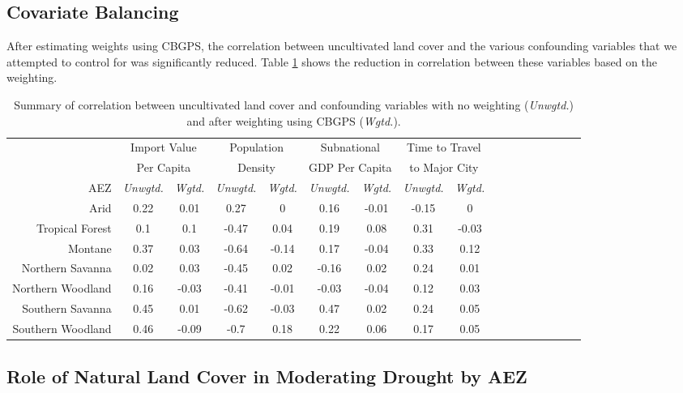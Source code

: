 \documentclass{article}
\begin{document}
\subsection{Covariate Balancing}
After estimating weights using CBGPS, the correlation between uncultivated land cover and the various confounding variables that we attempted to control for was significantly reduced.  Table \ref{tab:CBPSsum} shows the reduction in correlation between these variables based on the weighting.

\begin{table}[h!]
	\begin{center}
		\begin{tabular}{r | c c c c c c c c c c c c c c c c }
&	\multicolumn{2}{c}{Import Value} &	\multicolumn{2}{c}{Population} &	\multicolumn{2}{c}{Subnational}	&	\multicolumn{2}{c}{Time to Travel}	\\
&	\multicolumn{2}{c}{Per Capita} &	\multicolumn{2}{c}{Density} &	\multicolumn{2}{c}{GDP Per Capita}	&	\multicolumn{2}{c}{to Major City}	\\
	\cmidrule(lr){2-3}\cmidrule(lr){4-5} \cmidrule(lr){6-7}\cmidrule(lr){8-9}
      AEZ	&	\textit{Unwgtd.}	&	\textit{Wgtd.}	&	\textit{Unwgtd.}	&	\textit{Wgtd.}	&	\textit{Unwgtd.}	&	\textit{Wgtd.}	&	\textit{Unwgtd.}	&	\textit{Wgtd.}	\\
\hline									
Arid	&	0.22	&	0.01	&	0.27	&	0 &	0.16	&	-0.01	&	-0.15	&	0	\\
Tropical Forest	&	0.1	&	0.1	&	-0.47	&	0.04&	0.19	&	0.08	&	0.31	&	-0.03	\\
Montane	&	0.37	&	0.03	&	-0.64	&	-0.14&	0.17	&	-0.04	&	0.33	&	0.12	\\
Northern Savanna	&	0.02	&	0.03	&	-0.45	&	0.02&	-0.16	&	0.02	&	0.24	&	0.01	\\
Northern Woodland	&	0.16	&	-0.03	&	-0.41	&	-0.01&	-0.03	&	-0.04	&	0.12	&	0.03	\\
Southern Savanna	&	0.45	&	0.01	&	-0.62	&	-0.03&	0.47	&	0.02	&	0.24	&	0.05	\\
Southern Woodland	&	0.46	&	-0.09	&	-0.7	&	0.18&	0.22	&	0.06	&	0.17	&	0.05	\\	
		\end{tabular}
    \caption{Summary of correlation between uncultivated land cover and confounding variables with no weighting (\textit{Unwgtd.}) and after weighting using CBGPS (\textit{Wgtd.}).}
	\label{tab:CBPSsum}
	\end{center}
\end{table}

\subsection{Role of Natural Land Cover in Moderating Drought by AEZ}
\end{document}
